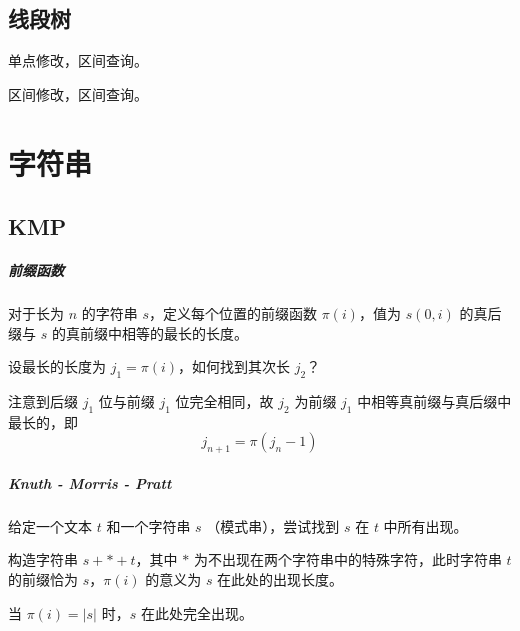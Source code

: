 \documentclass{probook}
\begin{document}
\begin{multicols}{2}


\section{线段树}

单点修改，区间查询。



区间修改，区间查询。









\chapter{字符串}

\section{KMP}

\paragraph{前缀函数}

对于长为 $n$ 的字符串 $s$，定义每个位置的前缀函数 $\pi(i)$，值为 $s(0,i)$ 的真后缀与 $s$ 的真前缀中相等的最长的长度。

设最长的长度为 $j_1=\pi(i)$，如何找到其次长 $j_2$？

注意到后缀 $j_1$ 位与前缀 $j_1$ 位完全相同，故 $j_2$ 为前缀 $j_1$ 中相等真前缀与真后缀中最长的，即
\[j_{n+1} = \pi(j_n-1)\]



\paragraph{Knuth - Morris - Pratt}

给定一个文本 $t$ 和一个字符串 $s$ （模式串），尝试找到 $s$ 在 $t$ 中所有出现。

构造字符串 $s+*+t$，其中 $*$ 为不出现在两个字符串中的特殊字符，此时字符串 $t$ 的前缀恰为 $s$，$\pi(i)$ 的意义为 $s$ 在此处的出现长度。

当 $\pi(i)=|s|$ 时，$s$ 在此处完全出现。


\end{multicols}
\end{document}
